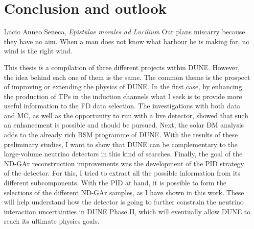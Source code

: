 \chapter{Conclusion and outlook}
\label{chapter:conclusion}

\begin{chapquote}{Lucio Anneo Seneca, \textit{Epistulae morales ad Lucilium}}
    Our plans miscarry because they have no aim. When a man does not know what harbour he is making for, no wind is the right wind.
\end{chapquote}

This thesis is a compilation of three different projects within DUNE. However, the idea behind each one of them is the same. The common theme is the prospect of improving or extending the physics of DUNE. In the first case, by enhancing the production of TPs in the induction channels what I seek is to provide more useful information to the FD data selection. The investigations with both data and MC, as well as the opportunity to run with a live detector, showed that such an enhancement is possible and should be pursued. Next, the solar DM analysis adds to the already rich BSM programme of DUNE. With the results of these preliminary studies, I want to show that DUNE can be complementary to the large-volume neutrino detectors in this kind of searches. Finally, the goal of the ND-GAr reconstruction improvements was the development of the PID strategy of the detector. For this, I tried to extract all the possible information from its different subcomponents. With the PID at hand, it is possible to form the selections of the different ND-GAr samples, as I have shown in this work. These will help understand how the detector is going to further constrain the neutrino interaction uncertainties in DUNE Phase II, which will eventually allow DUNE to reach its ultimate physics goals.


